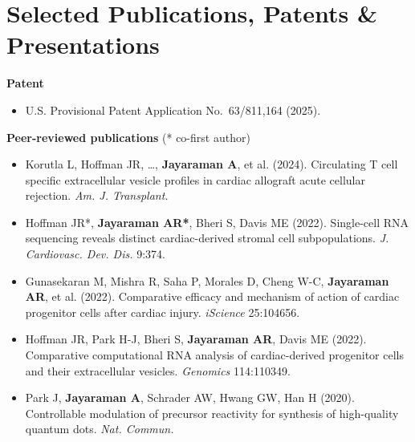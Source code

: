 \documentclass[letterpaper,11pt]{article}
\begin{document}
\section*{Selected Publications, Patents \& Presentations}
\begingroup\small

\textbf{Patent}
\begin{itemize}
  \item U.S. Provisional Patent Application No.~63/811,164 (2025).
\end{itemize}

\textbf{Peer-reviewed publications} (* co-first author)
\begin{itemize}
  \item Korutla L, Hoffman JR, \ldots, \textbf{Jayaraman A}, et al. (2024).
  Circulating T cell specific extracellular vesicle profiles in cardiac
  allograft acute cellular rejection. \textit{Am. J. Transplant.}

  \item Hoffman JR*, \textbf{Jayaraman AR*}, Bheri S, Davis ME (2022).
  Single-cell RNA sequencing reveals distinct cardiac-derived stromal cell
  subpopulations. \textit{J. Cardiovasc. Dev. Dis.} 9:374.

  \item Gunasekaran M, Mishra R, Saha P, Morales D, Cheng W-C,
  \textbf{Jayaraman AR}, et al. (2022). Comparative efficacy and mechanism
  of action of cardiac progenitor cells after cardiac injury.
  \textit{iScience} 25:104656.

  \item Hoffman JR, Park H-J, Bheri S, \textbf{Jayaraman AR}, Davis ME
  (2022). Comparative computational RNA analysis of cardiac-derived
  progenitor cells and their extracellular vesicles.
  \textit{Genomics} 114:110349.

  \item Park J, \textbf{Jayaraman A}, Schrader AW, Hwang GW, Han H (2020).
  Controllable modulation of precursor reactivity for synthesis of
  high-quality quantum dots. \textit{Nat. Commun.}
\end{itemize}
\end{document}
